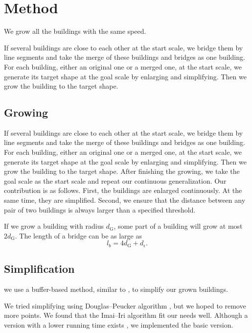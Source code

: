 \documentclass[graybox]{svmult}
\begin{document}
\section{Method}

We grow all the buildings with the same speed.


If several buildings are close to each other at the start 
scale, we bridge them by line segments and take the merge of these 
buildings 
and bridges as one building.
For each building, either an original one or a merged one, at the start 
scale, 
we generate its target shape at 
the goal scale by enlarging and simplifying. Then we grow the  
building to the target shape. 

\subsection{Growing}
If several buildings are close to each other at the start 
scale, we bridge them by line segments and take the merge of these 
buildings 
and bridges as one building.
For each building, either an original one or a merged one, at the start 
scale, 
we generate its target shape at 
the goal scale by enlarging and simplifying. Then we grow the  
building to the target shape. 
%
After finishing the growing, we take the goal scale as the 
start scale and repeat our continuous generalization.
\newline\indent
Our contribution is as follows. First, the buildings 
are enlarged continuously. At the same time, they are simplified. 
Second, we ensure that the distance between any pair of two buildings is 
always larger than a specified threshold.

If we grow a building with radius $d_\mathrm{G}$, some part of a building will 
grow at most $2d_\mathrm{G}$.
The length of a bridge can be as large as
\begin{equation}
\label{eq:BridgeLength}
l_b=4d_\mathrm{G}+d_\epsilon.
\end{equation}

\subsection{Simplification}
we use a buffer-based method, similar to \textcite{Damen2008,Meijers2016}, to 
simplify our grown buildings.

We tried simplifying using Douglas--Peucker algorithm \parencite{Douglas1973}, 
but we hoped to remove more points. We found that the Imai--Iri 
algorithm \parencite{ImaiIri1988} fit our needs well. Although a version with a 
lower running time exists \parencite[see][]{Chan1992}, we implemented the basic 
version.
\end{document}
